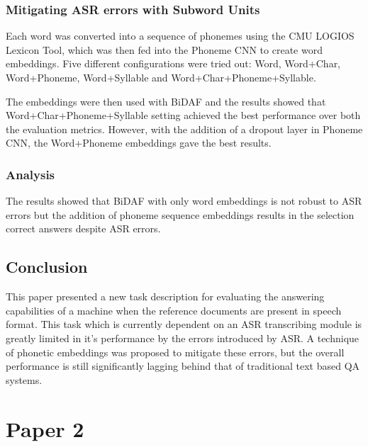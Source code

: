 \documentclass[a4paper]{article}
\begin{document}
\subsubsection{Mitigating ASR errors with Subword Units}
Each word was converted into a sequence of phonemes using the CMU LOGIOS Lexicon Tool, which was then fed into the Phoneme CNN to create word embeddings. Five different configurations were tried out: Word, Word+Char, Word+Phoneme, Word+Syllable and Word+Char+Phoneme+Syllable.

The embeddings were then used with BiDAF and the results showed that Word+Char+Phoneme+Syllable setting achieved the best performance over both the evaluation metrics. However, with the addition of a dropout layer in Phoneme CNN, the Word+Phoneme embeddings gave the best results.

\subsubsection{Analysis}
The results showed that BiDAF with only word embeddings is not robust to ASR errors but the addition of phoneme sequence embeddings results in the selection correct answers despite ASR errors.

\subsection{Conclusion}
This paper presented a new task description for evaluating the answering capabilities of a machine when the reference documents are present in speech format. This task which is currently dependent on an ASR transcribing module is greatly limited in it's performance by the errors introduced by ASR. A technique of phonetic embeddings was proposed to mitigate these errors, but the overall performance is still significantly lagging behind that of traditional text based QA systems.

\section{Paper 2}




\end{document}
